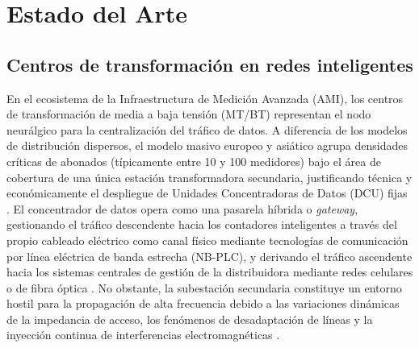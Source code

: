 \chapter{Estado del Arte}
\label{ch:state_of_the_art}

\section{Centros de transformación en redes inteligentes}
\label{sec:centros_transformacion}
En el ecosistema de la Infraestructura de Medición Avanzada (AMI), los centros de transformación de media a baja tensión (MT/BT) representan el nodo neurálgico para la centralización del tráfico de datos. A diferencia de los modelos de distribución dispersos, el modelo masivo europeo y asiático agrupa densidades críticas de abonados (típicamente entre 10 y 100 medidores) bajo el área de cobertura de una única estación transformadora secundaria, justificando técnica y económicamente el despliegue de Unidades Concentradoras de Datos (DCU) fijas \cite{6925952}. El concentrador de datos opera como una pasarela híbrida o \textit{gateway}, gestionando el tráfico descendente hacia los contadores inteligentes a través del propio cableado eléctrico como canal físico mediante tecnologías de comunicación por línea eléctrica de banda estrecha (NB-PLC), y derivando el tráfico ascendente hacia los sistemas centrales de gestión de la distribuidora mediante redes celulares o de fibra óptica \cite{SHARMA2017704, 10843716}. No obstante, la subestación secundaria constituye un entorno hostil para la propagación de alta frecuencia debido a las variaciones dinámicas de la impedancia de acceso, los fenómenos de desadaptación de líneas y la inyección continua de interferencias electromagnéticas \cite{9115397, 9881962}.

